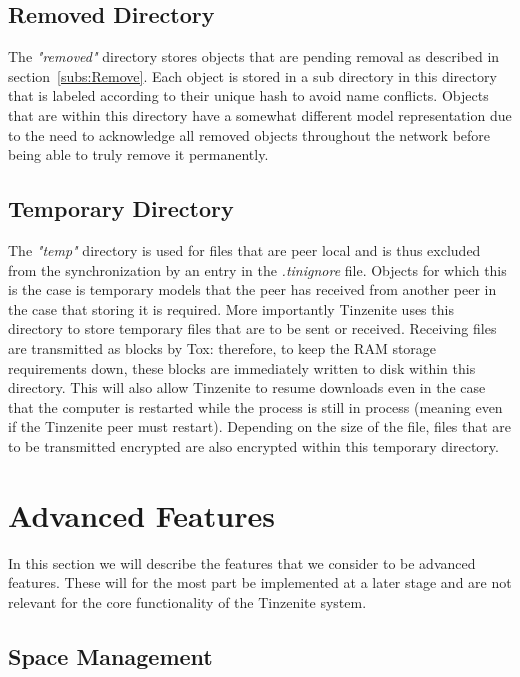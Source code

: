 \subsection{Removed Directory}
\label{sub:Removed Directory}

The \textit{"removed"} directory stores objects that are pending removal as described in section~\ref{subs:Remove}.
Each object is stored in a sub directory in this directory that is labeled according to their unique hash to avoid name conflicts.
Objects that are within this directory have a somewhat different model representation due to the need to acknowledge all removed objects throughout the network before being able to truly remove it permanently.

\subsection{Temporary Directory}
\label{sub:Temporary Directory}

The \textit{"temp"} directory is used for files that are peer local and is thus excluded from the synchronization by an entry in the \textit{.tinignore} file.
Objects for which this is the case is temporary models that the peer has received from another peer in the case that storing it is required.
More importantly Tinzenite uses this directory to store temporary files that are to be sent or received.
Receiving files are transmitted as blocks by Tox: therefore, to keep the RAM storage requirements down, these blocks are immediately written to disk within this directory.
This will also allow Tinzenite to resume downloads even in the case that the computer is restarted while the process is still in process (meaning even if the Tinzenite peer must restart).
Depending on the size of the file, files that are to be transmitted encrypted are also encrypted within this temporary directory.

\section{Advanced Features}
\label{sec:Advanced Features}

In this section we will describe the features that we consider to be advanced features.
These will for the most part be implemented at a later stage and are not relevant for the core functionality of the Tinzenite system.

\subsection{Space Management}
\label{sub:Space Management}

